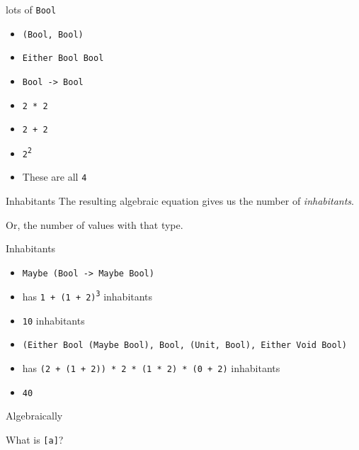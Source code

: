 \begin{frame}
\begin{block}{lots of \lstinline{Bool}}
\begin{itemize}
  \item<1-> \lstinline{(Bool, Bool)}
  \item<1-> \lstinline{Either Bool Bool}
  \item<1-> \lstinline{Bool -> Bool}
  \item<2-> \lstinline{2 * 2}
  \item<2-> \lstinline{2 + 2}
  \item<2-> \lstinline{2}\textsuperscript{\lstinline{2}}
  \item<3-> These are all \lstinline{4}
\end{itemize}
\end{block}
\end{frame}

\begin{frame}
\begin{block}{Inhabitants}
The resulting algebraic equation gives us the number of \emph{inhabitants}.

Or, the number of values with that type.
\end{block}
\end{frame}

\begin{frame}
\begin{block}{Inhabitants}
\begin{itemize}
  \item<1-> \lstinline{Maybe (Bool -> Maybe Bool)}
  \item<1-> has \lstinline{1 + (1 + 2)}\textsuperscript{\lstinline{3}} inhabitants
  \item<1-> \lstinline{10} inhabitants
  \item<2-> \scriptsize{\lstinline{(Either Bool (Maybe Bool), Bool, (Unit, Bool), Either Void Bool)}}
  \item<2-> has \lstinline{(2 + (1 + 2)) * 2 * (1 * 2) * (0 + 2)} inhabitants
  \item<2-> \lstinline{40}
\end{itemize}
\end{block}
\end{frame}

\begin{frame}
\begin{block}{Algebraically}
\begin{center}
What is \lstinline{[a]}?
\end{center}
\end{block}
\end{frame}

